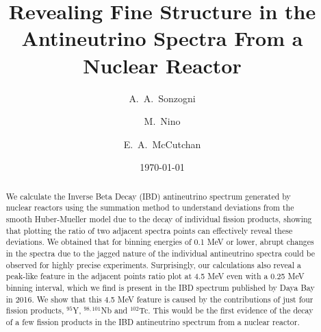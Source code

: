\documentclass[twocolumn,amsmath,amssymb,10pt,superscriptaddress,a4paper,letterpaper,fleqn]{revtex4-1}
\begin{document}
 \setcounter{page}{1}
 
 
 \title{Revealing Fine Structure in the Antineutrino Spectra From a Nuclear Reactor}

 \author{A.~A.~Sonzogni}

\author{M.~Nino}
              
                               
 \author{E.~A.~McCutchan}
              
                                   

     

 \date{\today}
 
 \begin{abstract}
 {
We calculate the Inverse Beta Decay (IBD) antineutrino spectrum generated by nuclear reactors using the summation method  to
understand deviations from the smooth Huber-Mueller model due to the decay of individual fission products,
showing that plotting the ratio of two adjacent spectra points can effectively reveal these deviations.
We obtained that for binning energies of 0.1 MeV or lower, abrupt changes in the spectra  due
to the jagged nature of the individual antineutrino spectra could be observed for highly precise experiments.   
Surprisingly, our calculations also reveal  a peak-like feature in the adjacent points ratio plot at 4.5 MeV 
even with a 0.25 MeV binning interval, 
which we find is present in the IBD  spectrum published by Daya Bay in 2016.
We show that this 4.5 MeV feature is caused by the contributions of just four fission products, $^{95}$Y, $^{98,101}$Nb and $^{102}$Tc.
This would be the first evidence of the decay of a few fission products in the IBD antineutrino spectrum from a
nuclear reactor.
 }
 \end{abstract}
 \maketitle

\end{document}

